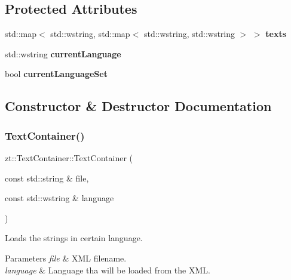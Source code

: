 \subsection*{Protected Attributes}
\begin{DoxyCompactItemize}
\item 
\mbox{\label{classzt_1_1_text_container_a006f0e6cf74b30c2dde1a913a41428ff}} 
std\+::map$<$ std\+::wstring, std\+::map$<$ std\+::wstring, std\+::wstring $>$ $>$ {\bfseries texts}
\item 
\mbox{\label{classzt_1_1_text_container_a5e25e128fcf3a8c3695c7943e0c88b7e}} 
std\+::wstring {\bfseries current\+Language}
\item 
\mbox{\label{classzt_1_1_text_container_aea1fd7acc9ff5f5421f8d76b86054ffe}} 
bool {\bfseries current\+Language\+Set}
\end{DoxyCompactItemize}


\subsection{Constructor \& Destructor Documentation}
\mbox{\label{classzt_1_1_text_container_a0c5dfc54f704d1f89f68c12408b9e40d}} 
\subsubsection{\texorpdfstring{Text\+Container()}{TextContainer()}}
{\footnotesize\ttfamily zt\+::\+Text\+Container\+::\+Text\+Container (\begin{DoxyParamCaption}\item[{const std\+::string \&}]{file,  }\item[{const std\+::wstring \&}]{language }\end{DoxyParamCaption})}



Loads the strings in certain language. 


\begin{DoxyParams}{Parameters}
{\em file} & X\+ML filename. \\
\hline
{\em language} & Language tha will be loaded from the X\+ML. \\
\hline
\end{DoxyParams}


